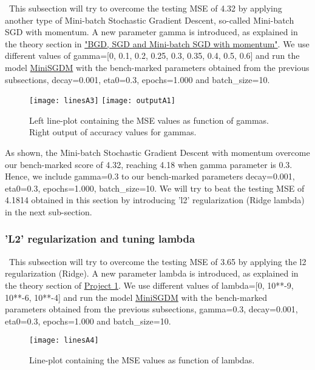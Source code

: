 \qquad \, This subsection will try to overcome the testing MSE of 4.32 by applying another type of Mini-batch Stochastic Gradient Descent, so-called Mini-batch SGD with momentum. A new parameter gamma is introduced, as explained in the theory section in \hyperref[chap:BGD, SGD and Mini-batch SGD with momentum]{"BGD, SGD and Mini-batch SGD with momentum"}. We use different values of gamma=[0, 0.1, 0.2, 0.25, 0.3, 0.35, 0.4, 0.5, 0.6] and run the model \href{https://github.com/fabiorodp/UiO-FYS-STK4155/blob/master/Project2/package/gradient_descent.py}{MiniSGDM} with the bench-marked parameters obtained from the previous subsections, decay=0.001, eta0=0.3, epochs=1.000 and batch\_size=10.

\begin{figure}[H]
\label{fig:figA8}
\centering
\texttt{[image: linesA3]}
\texttt{[image: outputA1]}
\caption{Left line-plot containing the MSE values as function of gammas. Right output of accuracy values for gammas.}
\end{figure}

As shown, the Mini-batch Stochastic Gradient Descent with momentum overcome our bench-marked score of 4.32, reaching 4.18 when gamma parameter is 0.3.\\

Hence, we include gamma=0.3 to our bench-marked parameters decay=0.001, eta0=0.3, epochs=1.000, batch\_size=10. We will try to beat the testing MSE of 4.1814 obtained in this section by introducing 'l2' regularization (Ridge lambda) in the next sub-section.

\subsubsection{'L2' regularization and tuning lambda}
\label{chap:'L2' regularization and tuning lambda}

\qquad \, This subsection will try to overcome the testing MSE of 3.65 by applying the l2 regularization (Ridge). A new parameter lambda is introduced, as explained in the theory section of \href{https://github.com/fabiorodp/UiO-FYS-STK4155/blob/master/Project1}{Project 1}. We use different values of lambda=[0, 10**-9, 10**-6, 10**-4] and run the model \href{https://github.com/fabiorodp/UiO-FYS-STK4155/blob/master/Project2/package/gradient_descent.py}{MiniSGDM} with the bench-marked parameters obtained from the previous subsections, gamma=0.3, decay=0.001, eta0=0.3, epochs=1.000 and batch\_size=10.

\begin{figure}[H]
\label{fig:figA9}
\centering
\texttt{[image: linesA4]}
\caption{Line-plot containing the MSE values as function of lambdas.}
\end{figure}

